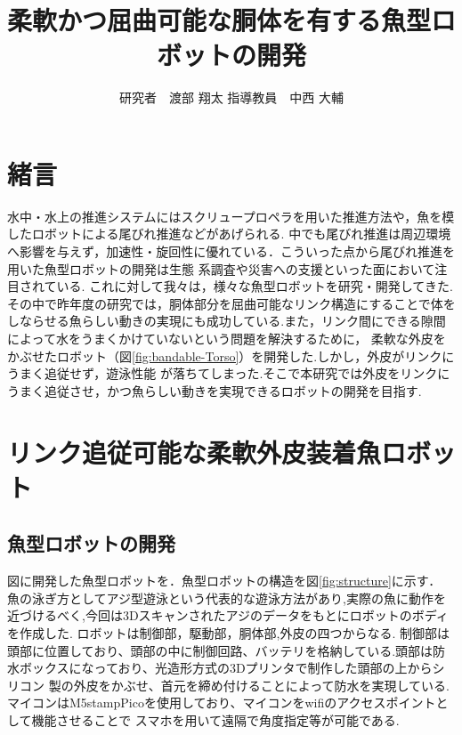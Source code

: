 \documentclass{jarticle}
\begin{document}

\title{
柔軟かつ屈曲可能な胴体を有する魚型ロボットの開発
}
\author{
研究者　渡部 翔太\;\;\;
指導教員　中西 大輔
}

\maketitle

\thispagestyle{empty}  %

\section{緒言}
水中・水上の推進システムにはスクリュープロペラを用いた推進方法や，魚を模したロボットによる尾びれ推進などがあげられる\cite{ichi}.
中でも尾びれ推進は周辺環境へ影響を与えず，加速性・旋回性に優れている．こういった点から尾びれ推進を用いた魚型ロボットの開発は生態
系調査や災害への支援といった面において注目されている\cite{ni}.
これに対して我々は，様々な魚型ロボットを研究・開発してきた.その中で昨年度の研究では，胴体部分を屈曲可能なリンク構造にすることで体を
しならせる魚らしい動きの実現にも成功している.また，リンク間にできる隙間によって水をうまくかけていないという問題を解決するために，
柔軟な外皮をかぶせたロボット（図\ref{fig:bandable-Torso}）を開発した\cite{san}.しかし，外皮がリンクにうまく追従せず，遊泳性能
が落ちてしまった.そこで本研究では外皮をリンクにうまく追従させ，かつ魚らしい動きを実現できるロボットの開発を目指す.


\section{リンク追従可能な柔軟外皮装着魚ロボット}
\subsection{魚型ロボットの開発}
図に開発した魚型ロボットを．魚型ロボットの構造を図\ref{fig:structure}に示す．
魚の泳ぎ方としてアジ型遊泳という代表的な遊泳方法があり,実際の魚に動作を近づけるべく,今回は3Dスキャンされたアジのデータをもとにロボットのボディを作成した.
ロボットは制御部，駆動部，胴体部,外皮の四つからなる.
制御部は頭部に位置しており、頭部の中に制御回路、バッテリを格納している.頭部は防水ボックスになっており、光造形方式の3Dプリンタで制作した頭部の上からシリコン
製の外皮をかぶせ、首元を締め付けることによって防水を実現している.マイコンはM5stampPicoを使用しており、マイコンをwifiのアクセスポイントとして機能させることで
スマホを用いて遠隔で角度指定等が可能である.
\end{document}
